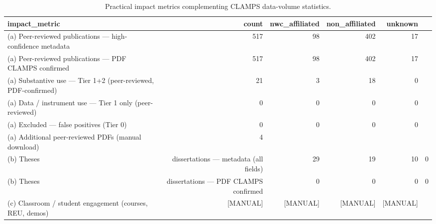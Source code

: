\begin{table}[ht]
\centering
\caption{Practical impact metrics complementing CLAMPS data-volume statistics.}
\label{tab:impact}
\small
\begin{tabular}{lrrrr}
\hline
impact\_metric & count & nwc\_affiliated & non\_affiliated & unknown \\
\hline
(a) Peer-reviewed publications — high-confidence metadata & 517 & 98 & 402 & 17 \\
(a) Peer-reviewed publications — PDF CLAMPS confirmed & 517 & 98 & 402 & 17 \\
(a) Substantive use — Tier 1+2 (peer-reviewed, PDF-confirmed) & 21 & 3 & 18 & 0 \\
(a) Data / instrument use — Tier 1 only (peer-reviewed) & 0 & 0 & 0 & 0 \\
(a) Excluded — false positives (Tier 0) & 0 & 0 & 0 & 0 \\
(a) Additional peer-reviewed PDFs (manual download) & 4 &  &  &  \\
(b) Theses & dissertations — metadata (all fields) & 29 & 19 & 10 & 0 \\
(b) Theses & dissertations — PDF CLAMPS confirmed & 0 & 0 & 0 & 0 \\
(c) Classroom / student engagement (courses, REU, demos) & [MANUAL] & [MANUAL] & [MANUAL] & [MANUAL] \\
\hline
\end{tabular}
\end{table}